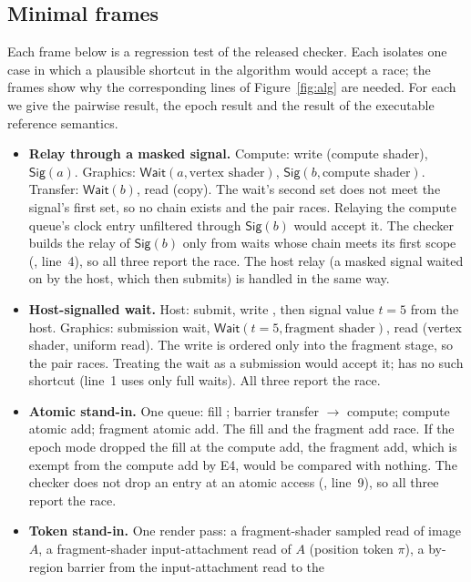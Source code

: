 \subsection{Minimal frames}
\label{app:counter}

Each frame below is a regression test of the released checker. Each isolates one case in which a plausible
shortcut in the algorithm would accept a race; the frames show why the corresponding lines of
Figure~\ref{fig:alg} are needed. For each we give the pairwise result, the epoch result and the result of the
executable reference semantics.
\begin{itemize}
\item \textbf{Relay through a masked signal.} Compute: write  (compute shader), $\mathsf{Sig}(a)$. Graphics:
  $\mathsf{Wait}(a, \text{vertex shader})$, $\mathsf{Sig}(b, \text{compute shader})$. Transfer: $\mathsf{Wait}(b)$,
  read  (copy). The wait's second set does not meet the signal's first set, so no chain exists and the
  pair races. Relaying the compute queue's clock entry unfiltered through $\mathsf{Sig}(b)$ would accept it. The
  checker builds the relay of $\mathsf{Sig}(b)$ only from waits whose chain meets its first scope (,
  line~4), so all three report the race. The host relay (a masked signal waited on by the host, which then submits)
  is handled in the same way.
\item \textbf{Host-signalled wait.} Host: submit, write , then signal value $t{=}5$ from the host. Graphics:
  submission wait, $\mathsf{Wait}(t{=}5, \text{fragment shader})$, read  (vertex shader, uniform read).
  The write is ordered only into the fragment stage, so the pair races. Treating the wait as a submission would
  accept it;  has no such shortcut (line~1 uses only full waits). All three report the race.
\item \textbf{Atomic stand-in.} One queue: fill ; barrier transfer $\to$ compute; compute atomic
  add; fragment atomic add. The fill and the fragment add race. If the epoch mode dropped the fill at the compute
  add, the fragment add, which is exempt from the compute add by E4, would be compared with nothing. The checker does
  not drop an entry at an atomic access (, line~9), so all three report the race.
\item \textbf{Token stand-in.} One render pass: a fragment-shader sampled read of image $A$, a fragment-shader
  input-attachment read of $A$ (position token $\pi$), a by-region barrier from the input-attachment read to the

\end{itemize}
